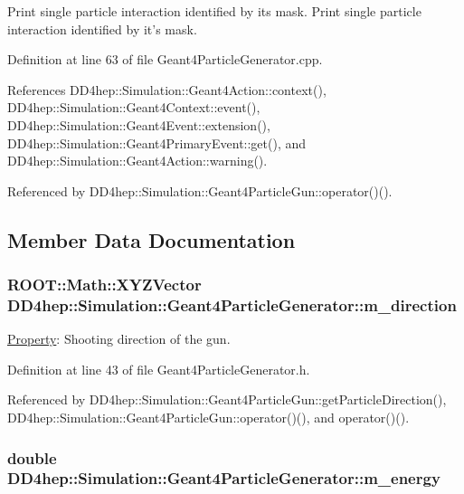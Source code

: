 Print single particle interaction identified by its mask. Print single particle interaction identified by it's mask. 

Definition at line 63 of file Geant4ParticleGenerator.cpp.

References DD4hep::Simulation::Geant4Action::context(), DD4hep::Simulation::Geant4Context::event(), DD4hep::Simulation::Geant4Event::extension(), DD4hep::Simulation::Geant4PrimaryEvent::get(), and DD4hep::Simulation::Geant4Action::warning().

Referenced by DD4hep::Simulation::Geant4ParticleGun::operator()().

\subsection{Member Data Documentation}
\hypertarget{class_d_d4hep_1_1_simulation_1_1_geant4_particle_generator_a2e9c3184ff8999d4e55e3158e3b43727}{
\subsubsection[{m\_\-direction}]{\setlength{\rightskip}{0pt plus 5cm}ROOT::Math::XYZVector {\bf DD4hep::Simulation::Geant4ParticleGenerator::m\_\-direction}}}
\label{class_d_d4hep_1_1_simulation_1_1_geant4_particle_generator_a2e9c3184ff8999d4e55e3158e3b43727}


\hyperlink{class_d_d4hep_1_1_property}{Property}: Shooting direction of the gun. 

Definition at line 43 of file Geant4ParticleGenerator.h.

Referenced by DD4hep::Simulation::Geant4ParticleGun::getParticleDirection(), DD4hep::Simulation::Geant4ParticleGun::operator()(), and operator()().\hypertarget{class_d_d4hep_1_1_simulation_1_1_geant4_particle_generator_a0177e67af8736780fa0e401d598a792f}{
\subsubsection[{m\_\-energy}]{\setlength{\rightskip}{0pt plus 5cm}double {\bf DD4hep::Simulation::Geant4ParticleGenerator::m\_\-energy}}}
\label{class_d_d4hep_1_1_simulation_1_1_geant4_particle_generator_a0177e67af8736780fa0e401d598a792f}


